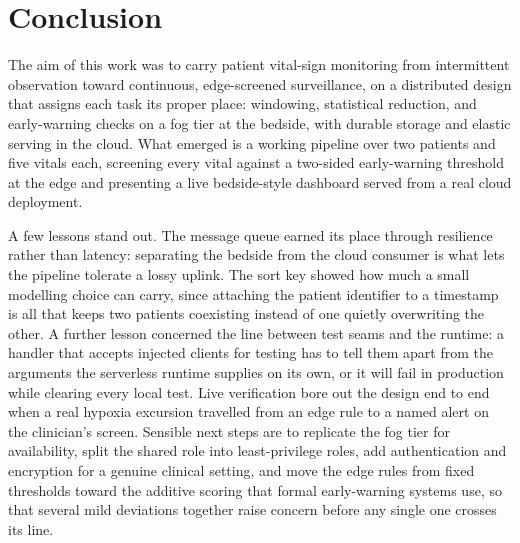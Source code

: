 \documentclass[conference]{IEEEtran}
\begin{document}
\section{Conclusion}

The aim of this work was to carry patient vital-sign monitoring from intermittent observation toward continuous, edge-screened surveillance, on a distributed design that assigns each task its proper place: windowing, statistical reduction, and early-warning checks on a fog tier at the bedside, with durable storage and elastic serving in the cloud. What emerged is a working pipeline over two patients and five vitals each, screening every vital against a two-sided early-warning threshold at the edge and presenting a live bedside-style dashboard served from a real cloud deployment.

A few lessons stand out. The message queue earned its place through resilience rather than latency: separating the bedside from the cloud consumer is what lets the pipeline tolerate a lossy uplink. The sort key showed how much a small modelling choice can carry, since attaching the patient identifier to a timestamp is all that keeps two patients coexisting instead of one quietly overwriting the other. A further lesson concerned the line between test seams and the runtime: a handler that accepts injected clients for testing has to tell them apart from the arguments the serverless runtime supplies on its own, or it will fail in production while clearing every local test. Live verification bore out the design end to end when a real hypoxia excursion travelled from an edge rule to a named alert on the clinician's screen. Sensible next steps are to replicate the fog tier for availability, split the shared role into least-privilege roles, add authentication and encryption for a genuine clinical setting, and move the edge rules from fixed thresholds toward the additive scoring that formal early-warning systems use, so that several mild deviations together raise concern before any single one crosses its line.



\end{document}
